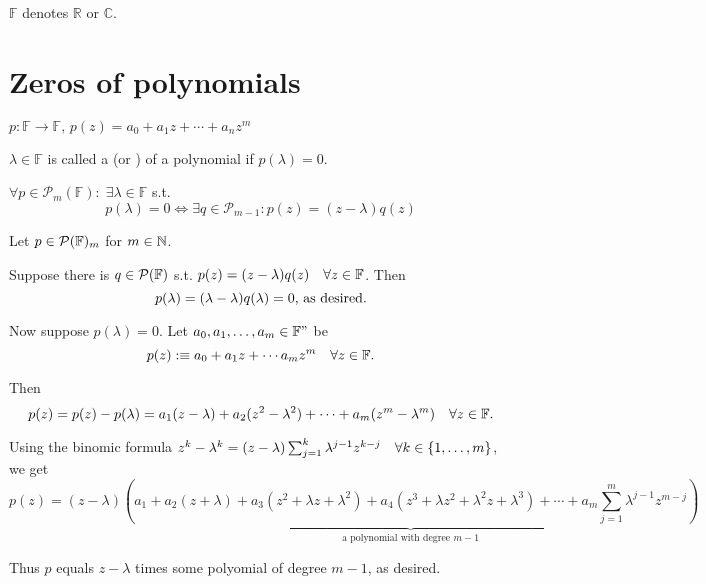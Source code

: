 
$\mathbb{F}$ denotes $\mathbb{R}$ or $\mathbb{C}$.

\section{Zeros of polynomials}
$p: \mathbb{F} \to \mathbb{F}, \, p(z) = a_0 + a_1z + \cdots + a_n z^m$

\setcounter{thm}{4}
\begin{mydef}
  $\lambda \in \mathbb{F}$ is called a   (or ) of a polynomial if $p(\lambda) = 0$.
\end{mydef}

\setcounter{thm}{5}
\begin{thm}
  \label{factororing-out-zeros-of-a-polynomial-always-possible}
  $\forall p \in \mathcal{P}_m(\mathbb{F}): \; \exists \lambda \in \mathbb{F}$ s.t.
  \begin{equation}
  	p(\lambda) = 0 \iff \exists q \in \mathcal{P}_{m-1}: p(z) = (z-\lambda)q(z)
  \end{equation}
\end{thm}
\begin{prf} Let $p\in \mathcal{P}(\mathbb{F})_m$ for $m\in \mathbb{N}$.
  
   Suppose there is $q \in \mathcal{P}(\mathbb{F})$ s.t. $p(z) = (z-\lambda)q(z) \quad \forall z \in \mathbb{F}$. Then
  \begin{equation}
    p(\lambda) = (\lambda -\lambda)q(\lambda) = 0,$ as desired.$
  \end{equation}
  
   Now suppose $p(\lambda)=0$. Let $a_0, a_1, \ldots, a_m \in \mathbb{F}"$ be \st
  \begin{equation}
    p(z) :\equiv a_0 + a_1z + \cdots a_mz^m \quad \forall z \in  \mathbb{F}.
  \end{equation}
  
  Then
  \begin{equation}
    \label{eq: second formula of pz: pz = pz - plambda}
    p(z) = p(z)- p(\lambda) = a_1 (z-\lambda) + a_2 (z^2 - \lambda^2) + \cdots+ a_m (z^m- \lambda^m) \quad \forall z \in \mathbb{F}.
  \end{equation}
  
  Using the binomic formula 
  $z^k - \lambda^k = (z-\lambda) \sum_{j=1}^{k} \lambda^{j-1}z^{k-j} \quad \forall k\in \{ 1, \ldots, m \}$, we get 
  \begin{equation}
    p(z) = (z-\lambda)
    \underbrace{
      \left(
        a_1 + a_2 (z+\lambda) + a_3(z^2 + \lambda z + \lambda^2) +
        a_4 (z^3 + \lambda z^2 + \lambda^2 z + \lambda^3) 
        + \cdots +
        a_m \sum_{j=1}^{m} \lambda^{j-1} z^{m-j}
      \right)}_{\text{a polynomial with degree $m-1$}}
  \end{equation}
  
  Thus $p$ equals $z-\lambda$ times some polyomial of degree $m-1$, as desired.
\end{prf}

